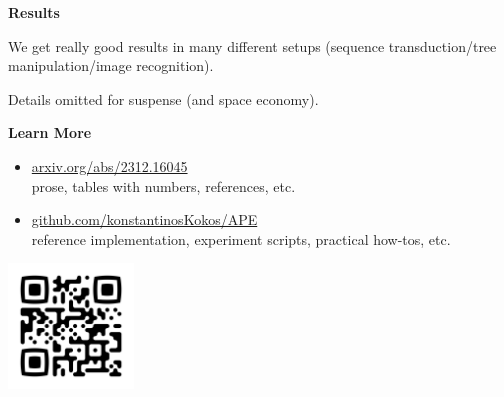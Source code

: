 \documentclass{article}
\newcommand{\sectionfont}{\fontsize{34}{34}\selectfont\setlength{\parskip}{1\baselineskip}}
\newcommand{\nfont}{\fontsize{21}{22}\selectfont\setlength{\parskip}{1\baselineskip}}
\newcommand{\light}[1]{\textcolor{gray!90}{#1}}
\begin{document}
\begin{minipage}[t]{0.286\textwidth}
		\sectionfont
		\vspace{\parskip}
		\textbf{Results}
		\nfont
		
		We get really good results in many different setups (sequence transduction/tree manipulation/image recognition).\\
		\vspace{-2\baselineskip}
		\begin{flushright}
				\light{Details omitted for suspense (and space economy).}
		\end{flushright}
		
		\sectionfont
		\vspace{\parskip}
		\textbf{Learn More}
		\nfont
		
		\begin{itemize}[topsep=-0.5\baselineskip]
			\item \href{https://arxiv.org/abs/2312.16045}{arxiv.org/abs/2312.16045}\\
			prose, tables with numbers, references, etc.
			\item \href{https://github.com/konstantinosKokos/APE}{github.com/konstantinosKokos/APE}\\
			reference implementation, experiment scripts, practical how-tos, etc.\\
		\end{itemize}
		
		\vspace{\parskip}\vspace{\parskip}
		\centering\includegraphics[width=0.25\textwidth]{qr.png}
	\end{minipage}%
\end{document}
